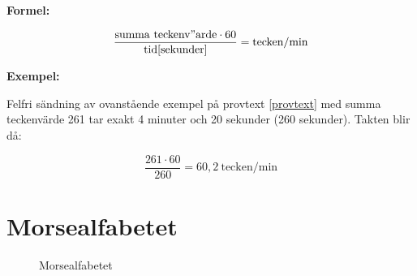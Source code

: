 \textbf{Formel:}

$$\frac{\mathrm{summa\ teckenv"arde }\cdot 60}{\mathrm{tid} [\mathrm{sekunder}]}
= \mathrm{tecken/min}$$

\textbf{Exempel:}

Felfri sändning av ovanstående exempel på provtext \ref{provtext} med summa
teckenvärde 261 tar exakt 4 minuter och 20 sekunder (260 sekunder).
Takten blir då:

$$\frac{261 \cdot 60}{260} = 60,2\ \mathrm{tecken/min}$$

\section{Morsealfabetet}
\label{morsealfabetet}

\begin{figure}
  \caption{Morsealfabetet}
  \label{fig:bild_morse_7}
\end{figure}

